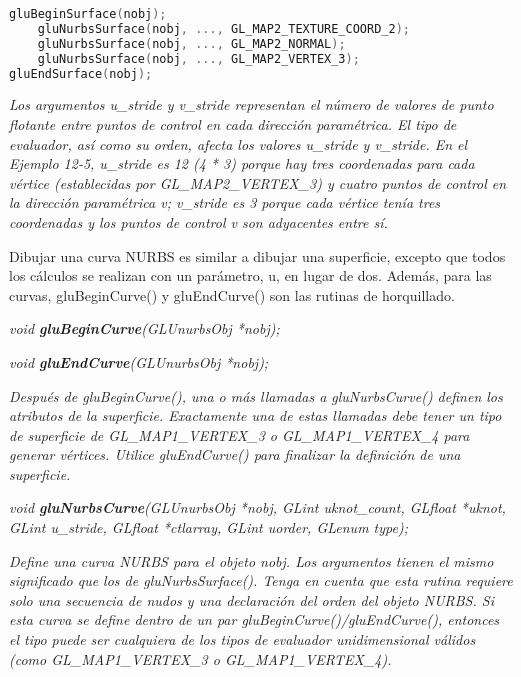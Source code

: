 \begin{description}
\begin{description}
{        }
\begin{lstlisting}[language=C++]
gluBeginSurface(nobj);
    gluNurbsSurface(nobj, ..., GL_MAP2_TEXTURE_COORD_2);
    gluNurbsSurface(nobj, ..., GL_MAP2_NORMAL);
    gluNurbsSurface(nobj, ..., GL_MAP2_VERTEX_3);
gluEndSurface(nobj);
\end{lstlisting}
        \item \textit{Los argumentos u\_stride y v\_stride representan el número de valores de punto flotante entre puntos de control en cada dirección paramétrica. El tipo de evaluador, así como su orden, afecta los valores u\_stride y v\_stride. En el Ejemplo 12-5, u\_stride es 12 (4 * 3) porque hay tres coordenadas para cada vértice (establecidas por GL\_MAP2\_VERTEX\_3) y cuatro puntos de control en la dirección paramétrica v; v\_stride es 3 porque cada vértice tenía tres coordenadas y los puntos de control v son adyacentes entre sí.
        }
    \end{description}
    Dibujar una curva NURBS es similar a dibujar una superficie, excepto que todos los cálculos se realizan con un parámetro, u, en lugar de dos. Además, para las curvas, gluBeginCurve() y gluEndCurve() son las rutinas de horquillado.
    \item \emph{void \textbf{gluBeginCurve}(GLUnurbsObj *nobj);}
    \item \emph{void \textbf{gluEndCurve}(GLUnurbsObj *nobj);}
    \begin{description}
        \item \textit{Después de gluBeginCurve(), una o más llamadas a gluNurbsCurve() definen los atributos de la superficie. Exactamente una de estas llamadas debe tener un tipo de superficie de GL\_MAP1\_VERTEX\_3 o GL\_MAP1\_VERTEX\_4 para generar vértices. Utilice gluEndCurve() para finalizar la definición de una superficie.
        }
    \end{description}
    \item \emph{void \textbf{gluNurbsCurve}(GLUnurbsObj *nobj, GLint uknot\_count,
    GLfloat *uknot, GLint u\_stride, GLfloat *ctlarray,
    GLint uorder, GLenum type);}
    \begin{description}
        \item \textit{Define una curva NURBS para el objeto nobj. Los argumentos tienen el mismo significado que los de gluNurbsSurface(). Tenga en cuenta que esta rutina requiere solo una secuencia de nudos y una declaración del orden del objeto NURBS. Si esta curva se define dentro de un par gluBeginCurve()/gluEndCurve(), entonces el tipo puede ser cualquiera de los tipos de evaluador unidimensional válidos (como GL\_MAP1\_VERTEX\_3 o GL\_MAP1\_VERTEX\_4).
        }
    \end{description}
\end{description}

